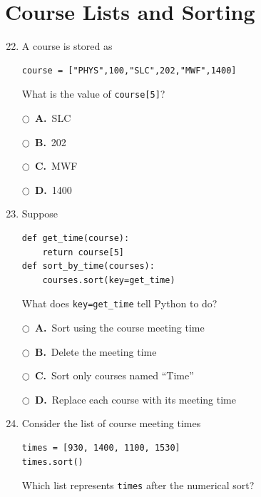 \documentclass[11pt]{article}
\newcommand{\choice}[2]{%
    \par\noindent
    \(\bigcirc\)\ \textbf{#1.}\ #2
}
\begin{document}
\section*{Course Lists and Sorting}

\begin{enumerate}
\setcounter{enumi}{21}


\item A course is stored as

\begin{verbatim}
course = ["PHYS",100,"SLC",202,"MWF",1400]
\end{verbatim}

What is the value of \texttt{course[5]}?

\choice{A}{SLC}
\choice{B}{202}
\choice{C}{MWF}
\choice{D}{1400}



\item Suppose

\begin{verbatim}
def get_time(course):
    return course[5]
def sort_by_time(courses):
    courses.sort(key=get_time)
\end{verbatim}

What does \texttt{key=get\_time} tell Python to do?

\choice{A}{Sort using the course meeting time}

\choice{B}{Delete the meeting time}

\choice{C}{Sort only courses named ``Time''}

\choice{D}{Replace each course with its meeting time}



\item Consider the list of course meeting times

\begin{verbatim}
times = [930, 1400, 1100, 1530]
times.sort()
\end{verbatim}

Which list represents \texttt{times} after the numerical sort?


\end{enumerate}
\end{document}
